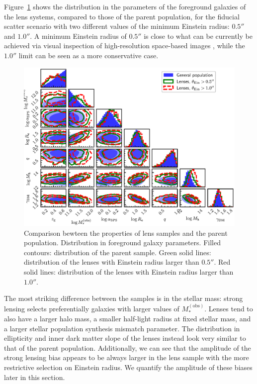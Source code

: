 \documentclass{aa}
\def\mobs{M_*^{(\mathrm{obs})}}
\def\Sref#1{Section~\ref{#1}\xspace}
\def\Fref#1{Figure~\ref{#1}\xspace}
\begin{document}
\Fref{fig:lenspars} shows the distribution in the parameters of the foreground galaxies of the lens systems, compared to those of the parent population, for the fiducial scatter scenario with two different values of the minimum Einstein radius: $0.5''$ and $1.0''$.
A minimum Einstein radius of $0.5''$ is close to what can be currently be achieved via visual inspection of high-resolution space-based images \cite{Gar++22}, while the $1.0''$ limit can be seen as a more conservative case.
\begin{figure}
\includegraphics[width=\textwidth]{lens_cornerplot.eps}
\caption{
Comparison bewteen the properties of lens samples and the parent population. Distribution in foreground galaxy parameters.
Filled contours: distribution of the parent sample.
Green solid lines: distribution of the lenses with Einstein radius larger than $0.5''$.
Red solid lines: distribution of the lenses with Einstein radius larger than $1.0''$.
\label{fig:lenspars}
}
\end{figure}

The most striking difference between the samples is in the stellar mass: strong lensing selects preferentially galaxies with larger values of $\mobs$.
Lenses tend to also have a larger halo mass, a smaller half-light radius at fixed stellar mass, and a larger stellar population synthesis mismatch parameter. The distribution in ellipticity and inner dark matter slope of the lenses instead look very similar to that of the parent population.
Additionally, we can see that the amplitude of the strong lensing bias appears to be always larger in the lens sample with the more restrictive selection on Einstein radius.
We quantify the amplitude of these biases later in this section.
\end{document}
